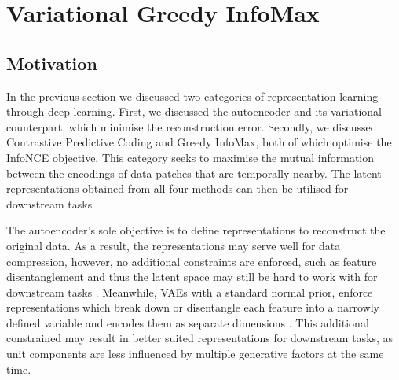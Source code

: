 \chapter{Variational Greedy InfoMax}

\section{Motivation} %
	In the previous section we discussed two categories of representation learning through deep learning. First, we discussed the autoencoder and its variational counterpart, which minimise the reconstruction error. Secondly, we discussed Contrastive Predictive Coding and Greedy InfoMax, both of which optimise the InfoNCE objective. This category seeks to maximise the mutual information between the encodings of data patches that are temporally nearby. The latent representations obtained from all four methods can then be utilised for downstream tasks \cite{bengioRepresentationLearningReview2013, weiRecentAdvancesVariational2021, oordRepresentationLearningContrastive2019, lowePuttingEndEndtoEnd2020}
	
		The autoencoder's sole objective is to define representations to reconstruct the original data. As a result, the representations may serve well for data compression, however, no additional constraints are enforced, such as feature disentanglement and thus the latent space may still be hard to work with for downstream tasks \cite{tschannenRecentAdvancesAutoencoderBased2018}. Meanwhile, VAEs with a standard normal prior, enforce representations which break down or disentangle each feature into a narrowly defined variable and encodes them as separate dimensions \cite{weiRecentAdvancesVariational2021}. This additional constrained may result in better suited representations for downstream tasks, as unit components are less influenced by multiple generative factors at the same time.

